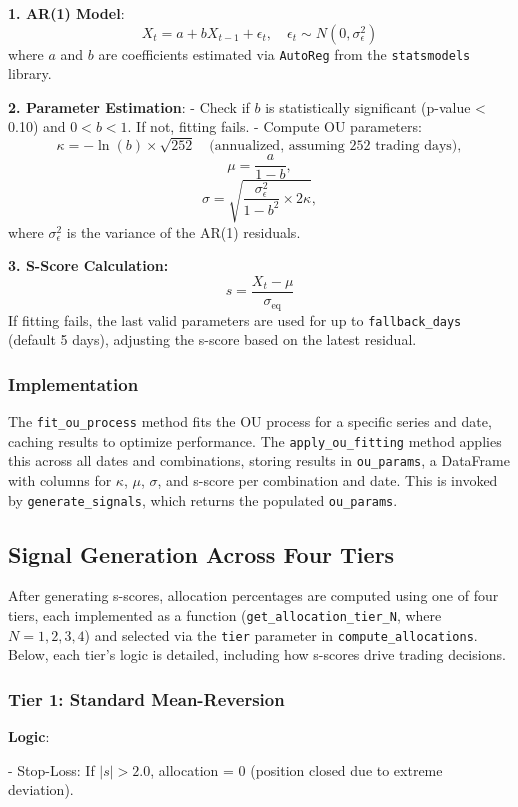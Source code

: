\documentclass[a4paper,12pt]{article}
\begin{document}
\textbf{1. AR(1) Model}:
\[
X_t = a + b X_{t-1} + \epsilon_t, \quad \epsilon_t \sim N(0, \sigma^2_\epsilon)
\]
where \(a\) and \(b\) are coefficients estimated via \texttt{AutoReg} from the \texttt{statsmodels} library.

\textbf{2. Parameter Estimation}:
- Check if \(b\) is statistically significant (p-value < 0.10) and \(0 < b < 1\). If not, fitting fails.
- Compute OU parameters:
\[
\kappa = -\ln(b) \times \sqrt{252} \quad \text{(annualized, assuming 252 trading days)},
\]
\[
\mu = \frac{a}{1 - b},
\]
\[
\sigma = \sqrt{\frac{\sigma^2_\epsilon}{1 - b^2} \times 2 \kappa},
\]
where \(\sigma^2_\epsilon\) is the variance of the AR(1) residuals.

\textbf{3. S-Score Calculation:}
\[
s = \frac{X_t - \mu}{\sigma_{\text{eq}}}
\]
If fitting fails, the last valid parameters are used for up to \texttt{fallback\_days} (default 5 days), adjusting the s-score based on the latest residual.

\subsubsection{Implementation}
The \texttt{fit\_ou\_process} method fits the OU process for a specific series and date, caching results to optimize performance. The \texttt{apply\_ou\_fitting} method applies this across all dates and combinations, storing results in \texttt{ou\_params}, a DataFrame with columns for \(\kappa\), \(\mu\), \(\sigma\), and s-score per combination and date. This is invoked by \texttt{generate\_signals}, which returns the populated \texttt{ou\_params}.

\subsection{Signal Generation Across Four Tiers}
After generating s-scores, allocation percentages are computed using one of four tiers, each implemented as a function (\texttt{get\_allocation\_tier\_N}, where \(N = 1, 2, 3, 4\)) and selected via the \texttt{tier} parameter in \texttt{compute\_allocations}. Below, each tier's logic is detailed, including how s-scores drive trading decisions.

\subsubsection{Tier 1: Standard Mean-Reversion}


\textbf{Logic}:

- Stop-Loss: If \(|s| > 2.0\), allocation = 0 (position closed due to extreme deviation).
\end{document}
